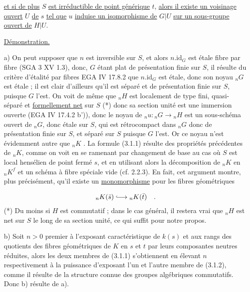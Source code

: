 
\underline{et si de plus} $S$ \underline{est irréductible de point générique} $t$, \underline{alors il existe un voisinage ouvert} $U$ \underline{de} $s$ \underline{tel que} $u$ \underline{induise un isomorphisme de} $G|U$ \underline{sur un sous-groupe ouvert de} $H|U$.

\underline{Démonstration.}

a) On peut supposer que $n$ est inversible sur $S$, et alors $n.\mathrm{id}_{G}$ est étale fibre par fibre (SGA 3 XV 1.3), donc, $G$ étant plat de présentation finie sur $S$, il résulte du critère d'étalité par fibres EGA IV 17.8.2 que $n.\mathrm{id}_{G}$ est étale, donc son noyau ${}_{n}G$ est étale ; il est clair d'ailleurs qu'il est séparé et de présentation finie sur $S$, puisque $G$ l'est. On voit de même que ${}_{n}H$ est localement de type fini, quasi-séparé et \underline{formellement net} sur $S$ (*) donc sa section unité est une immersion ouverte (EGA IV 17.4.2 b')), donc le noyau de ${}_{n}u: {}_{n}G \longrightarrow {}_{n}H$ est un sous-schéma ouvert de ${}_{n}G$, donc étale sur $S$, qui est rétrocompact dans ${}_{n}G$ donc de présentation finie sur $S$, et séparé sur $S$ puisque $G$ l'est. Or ce noyau n'est évidemment autre que ${}_{n}K$ . La formule (3.1.1) résulte des propriétés précédentes de ${}_{n}K$, comme on voit en se ramenant par changement de base au cas où $S$ est local hensélien de point fermé $s$, et en utilisant alors la décomposition de ${}_{n}K$ en ${}_{n}K^{f}$ et un schéma à fibre spéciale vide (cf. 2.2.3). En fait, cet argument montre, plus précisément, qu'il existe un \underline{monomorphisme} pour les fibres géométriques

\begin{equation*}
{}_{n}K(\bar{s}) \lhook\joinrel\longrightarrow {}_{n}K(\bar{t}) \quad .
\end{equation*}
(*) Du moins si $H$ est commutatif ; dans le cas général, il restera vrai que ${}_{n}H$ est net sur $S$ le long de sa section unité, ce qui suffit pour notre propos.



b)   Soit $n > 0$ premier à l'exposant caractéristique de $k(s)$ et aux rangs des quotients des fibres géométriques de $K$ en $s$ et $t$ par leurs composantes neutres réduites, alors les deux membres de (3.1.1) s'obtiennent en élevant $n$ respectivement à la puissance d'exposant l'un et l'autre membre de (3.1.2), comme il résulte de la structure connue des groupes algébriques commutatifs. Donc b) résulte de a).

